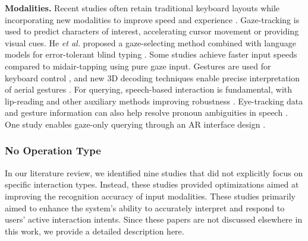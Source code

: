 \documentclass[review]{fcs}
\begin{document}
\textbf{Modalities.} Recent studies often retain traditional keyboard layouts while incorporating new modalities to improve speed and experience \cite{DBLP:conf/iui/ZhaoPTZWJBG23,DBLP:conf/chi/HeLP22,DBLP:journals/tvcg/ShenDK23,DBLP:conf/ismar/SongDK22,DBLP:conf/chi/Hedeshy0MS21,10474330}. Gaze-tracking is used to predict characters of interest, accelerating cursor movement or providing visual cues\cite{DBLP:conf/iui/ZhaoPTZWJBG23,10474330}. He \textit{et al.} proposed a gaze-selecting method combined with language models for error-tolerant blind typing \cite{DBLP:conf/chi/HeLP22}. Some studies achieve faster input speeds compared to midair-tapping using pure gaze input\cite{cui2023glancewriter,DBLP:conf/vr/HuDK24}. Gestures are used for keyboard control \cite{DBLP:conf/ismar/SongDK22}, and new 3D decoding techniques enable precise interpretation of aerial gestures \cite{DBLP:journals/tvcg/ShenDK23}. For querying, speech-based interaction is fundamental, with lip-reading and other auxiliary methods improving robustness \cite{DBLP:conf/chi/ZhangLHWLGZ23,DBLP:journals/tvcg/CaiML24}. Eye-tracking data and gesture information can also help resolve pronoun ambiguities in speech \cite{DBLP:conf/chi/0005WBCRF24,DBLP:journals/imwut/WangSWYYWJXY24}. One study enables gaze-only querying through an AR interface design \cite{DBLP:conf/uist/LiaoKJKS22}.


\subsubsection{No Operation Type}

In our literature review, we identified nine studies that did not explicitly focus on specific interaction types. Instead, these studies provided optimizations aimed at improving the recognition accuracy of input modalities. These studies primarily aimed to enhance the system's ability to accurately interpret and respond to users' active interaction intents. Since these papers are not discussed elsewhere in this work, we provide a detailed description here.
\end{document}
